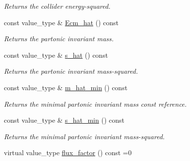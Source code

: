 \begin{DoxyCompactItemize}
\begin{DoxyCompactList}\small\item\em Returns the collider energy-\/squared. \end{DoxyCompactList}\item 
\hypertarget{a00308_af47155e6e1a988a08ac05fcf505c9aeb}{}const value\+\_\+type \& \hyperlink{a00308_af47155e6e1a988a08ac05fcf505c9aeb}{Ecm\+\_\+hat} () const \label{a00308_af47155e6e1a988a08ac05fcf505c9aeb}

\begin{DoxyCompactList}\small\item\em Returns the partonic invariant mass. \end{DoxyCompactList}\item 
\hypertarget{a00308_ab657762807a24b906892e6126540113b}{}const value\+\_\+type \& \hyperlink{a00308_ab657762807a24b906892e6126540113b}{s\+\_\+hat} () const \label{a00308_ab657762807a24b906892e6126540113b}

\begin{DoxyCompactList}\small\item\em Returns the partonic invariant mass-\/squared. \end{DoxyCompactList}\item 
\hypertarget{a00308_afecc06cfef167158a1e66a1692b7abc3}{}const value\+\_\+type \& \hyperlink{a00308_afecc06cfef167158a1e66a1692b7abc3}{m\+\_\+hat\+\_\+min} () const \label{a00308_afecc06cfef167158a1e66a1692b7abc3}

\begin{DoxyCompactList}\small\item\em Returns the minimal partonic invariant mass const reference. \end{DoxyCompactList}\item 
\hypertarget{a00308_a04d3384f909d541d7aea905622f8a4ec}{}const value\+\_\+type \& \hyperlink{a00308_a04d3384f909d541d7aea905622f8a4ec}{s\+\_\+hat\+\_\+min} () const \label{a00308_a04d3384f909d541d7aea905622f8a4ec}

\begin{DoxyCompactList}\small\item\em Returns the minimal partonic invariant mass-\/squared. \end{DoxyCompactList}\item 
\hypertarget{a00308_a90c718ed5a88168638ea93be51b2d44a}{}virtual value\+\_\+type \hyperlink{a00308_a90c718ed5a88168638ea93be51b2d44a}{flux\+\_\+factor} () const =0\label{a00308_a90c718ed5a88168638ea93be51b2d44a}


\end{DoxyCompactItemize}
